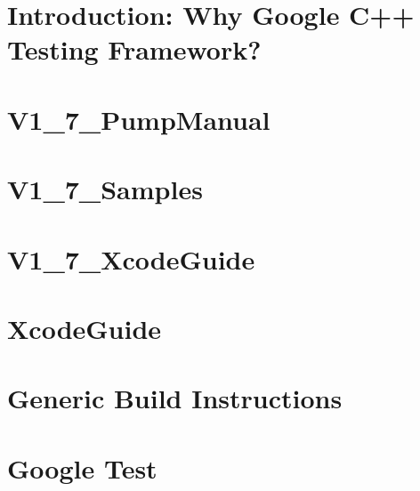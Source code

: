 \documentclass[twoside]{book}
\newcommand{\+}{\discretionary{\mbox{\scriptsize$\hookleftarrow$}}{}{}}
\begin{document}
\chapter{Introduction\+: Why Google C++ Testing Framework?}
\label{md_vendor_googletest_googletest_docs__v1_7__primer}

\chapter{V1\+\_\+7\+\_\+\+Pump\+Manual}
\label{md_vendor_googletest_googletest_docs__v1_7__pump_manual}

\chapter{V1\+\_\+7\+\_\+\+Samples}
\label{md_vendor_googletest_googletest_docs__v1_7__samples}

\chapter{V1\+\_\+7\+\_\+\+Xcode\+Guide}
\label{md_vendor_googletest_googletest_docs__v1_7__xcode_guide}

\chapter{Xcode\+Guide}
\label{md_vendor_googletest_googletest_docs__xcode_guide}

\chapter{Generic Build Instructions}
\label{md_vendor_googletest_googletest__r_e_a_d_m_e}

\chapter{Google Test}
\label{md_vendor_googletest__r_e_a_d_m_e}

\end{document}
